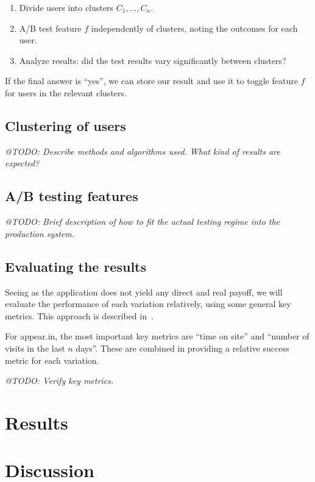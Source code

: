 \begin{enumerate}
  \item Divide users into clusters $C_1, \ldots, C_n$.
  \item A/B test feature $f$ independently of clusters, noting the outcomes for each user.
  \item Analyze results: did the test results vary significantly between clusters?
\end{enumerate}

If the final answer is ``yes'', we can store our result and use it to toggle feature $f$ for users in the relevant clusters.

\subsection{Clustering of users} %
\label{sub:clustering_of_users}

\emph{@TODO: Describe methods and algorithms used. What kind of results are expected?}


\subsection{A/B testing features} %
\label{sub:a_b_testing_features}

\emph{@TODO: Brief description of how to fit the actual testing regime into the production system.}


\subsection{Evaluating the results} %
\label{sub:evaluating_the_results}

Seeing as the application does not yield any direct and real payoff, we will evaluate the performance of each variation relatively, using some general key metrics. This approach is described in~\cite{Yue2012}.

For appear.in, the most important key metrics are ``time on site'' and ``number of visits in the last $n$ days''. These are combined in providing a relative success metric for each variation.

\emph{@TODO: Verify key metrics.}



\section{Results} %
\label{sec:results}


\section{Discussion} %
\label{sec:discussion}

